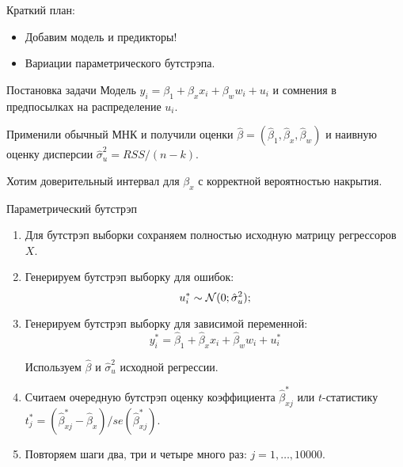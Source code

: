 
\begin{frame} %


\end{frame}



\begin{frame}{Краткий план:}
  \begin{itemize}[<+->]
    \item Добавим модель и предикторы!
    \item Вариации параметрического бутстрэпа.
  \end{itemize}
\end{frame}



\begin{frame}{Постановка задачи}
Модель $y_i = \beta_1 + \beta_x x_i + \beta_w w_i + u_i$ и \alert{сомнения} в предпосылках на распределение $u_i$. 

\pause
Применили обычный МНК и получили оценки $\hat \beta = (\hat \beta_1, \hat \beta_x, \hat \beta_w)$ и
наивную оценку дисперсии $\hat \sigma^2_u = RSS / (n - k)$.

\pause
Хотим доверительный интервал для $\beta_x$ с корректной вероятностью накрытия. 
\end{frame}



\begin{frame}{Параметрический бутстрэп}

  \begin{enumerate}[<+->]
    \item Для бутстрэп выборки сохраняем полностью исходную матрицу регрессоров $X$.
    \item Генерируем бутстрэп выборку для ошибок:
    \[
    u^*_i  \sim \mathcal{N}(0; \hat \sigma^2_u);
    \]
    \item Генерируем бутстрэп выборку для зависимой переменной:
    \[
      y^*_i = \hat \beta_1 + \hat\beta_x x_i + \hat \beta_w w_i + u^*_i
    \]
    
    \pause
    Используем $\hat\beta$ и $\hat\sigma^2_u$ \alert{исходной регрессии}.

    \item Считаем очередную бутстрэп оценку коэффициента $\hat \beta^*_{xj}$ или $t$-статистику 
    $t^*_{j} = (\hat \beta^*_{xj} - \hat\beta_x)/se(\hat \beta^*_{xj})$.
    \item Повторяем шаги два, три и четыре много раз: $j= 1, \ldots, 10000$.
\end{enumerate}
  
\end{frame}



